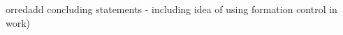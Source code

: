 \documentclass{iacas}
\begin{document}
or{red}{add concluding statements - including idea of using formation control in work)}


\end{document}
